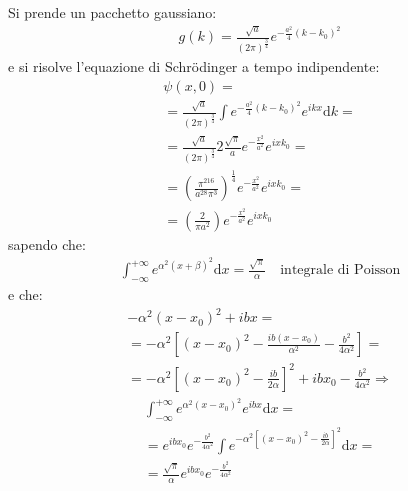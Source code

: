 Si prende un pacchetto gaussiano:
\begin{equation}\begin{split}
g\left(k\right)=\frac{\sqrt{a}}{\left(2\pi\right)^\frac{3}{4}}e^{-\frac{a^2}{4}\left(k-k_0\right)^2}
\end{split}\end{equation}
e si risolve l'equazione di Schrödinger a tempo indipendente:
\begin{equation}\begin{split}
\psi \left(x,0\right)=\\
=\frac{\sqrt{a}}{\left(2\pi\right)^\frac{3}{4}}\int{e^{-\frac{a^2}{4}\left(k-k_0\right)^2}e^{ikx}\textrm{d}k}=\\
=\frac{\sqrt{a}}{\left(2\pi\right)^\frac{3}{4}}2\frac{\sqrt{\pi}}{a}e^{-\frac{x^2}{a^2}}e^{ixk_0}=\\
=\left(\frac{\pi^216}{a^28\pi^3}\right)^{\frac{1}{4}}e^{-\frac{x^2}{a^2}}e^{ixk_0}=\\
=\left(\frac{2}{\pi a^2}\right)e^{-\frac{x^2}{a^2}}e^{ixk_0}
\end{split}\end{equation}
sapendo che:
\begin{equation}\begin{split}
\int_{-\infty }^{+\infty }{e^{\alpha^2\left(x+\beta \right)^2}\textrm{d}x}=\frac{\sqrt{\pi}}{\alpha} \quad \textrm{integrale di Poisson}
\end{split}\end{equation}
e che:
\begin{equation}\begin{split}
-\alpha^2\left(x-x_0\right)^2+ibx=\\
=-\alpha^2\left[\left(x-x_0\right)^2-\frac{ib\left(x-x_0\right)}{\alpha^2}-\frac{b^2}{4\alpha^2}\right]=\\
=-\alpha^2\left[\left(x-x_0\right)^2-\frac{ib}{2\alpha}\right]^2+ibx_0-\frac{b^2}{4\alpha^2} \Longrightarrow 
\end{split}\end{equation}
\begin{equation}\begin{split}
\int_{-\infty }^{+\infty }{e^{\alpha^2\left(x-x_0 \right)^2}e^{ibx}\textrm{d}x}=\\
=e^{ibx_0}e^{-\frac{b^2}{4\alpha^2}}\int{e^{-\alpha^2\left[\left(x-x_0\right)^2-\frac{ib}{2\alpha}\right]^2}\textrm{d}x}=\\
=\frac{\sqrt{\pi}}{\alpha}e^{ibx_0}e^{-\frac{b^2}{4\alpha^2}}
\end{split}\end{equation}

